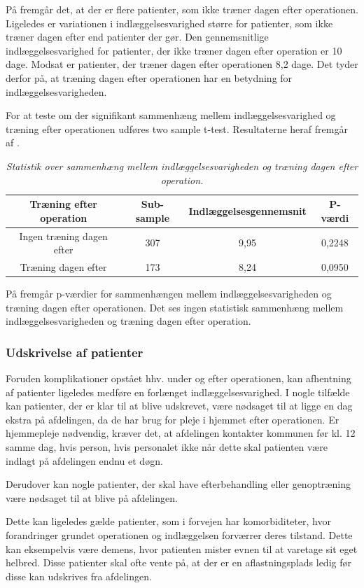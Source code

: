 \noindent
På  fremgår det, at der er flere patienter, som ikke træner dagen efter operationen. Ligeledes er variationen i indlæggelsesvarighed større for patienter, som ikke træner dagen efter end patienter der gør. Den gennemsnitlige indlæggelsesvarighed for patienter, der ikke træner dagen efter operation er 10 dage. Modsat er patienter, der træner dagen efter operationen 8,2 dage. Det tyder derfor på, at træning dagen efter operationen har en betydning for indlæggelsesvarigheden. 

For at teste om der signifikant sammenhæng mellem indlæggelsesvarighed og træning efter operationen udføres two sample t-test. Resultaterne heraf fremgår af . 

\begin{table}[H]
\centering
\begin{tabular}{|c|c|c|c|}
\hline
\textbf{Træning efter operation}    & \textbf{Sub-sample} & \textbf{Indlæggelsesgennemsnit} & \textbf{P-værdi} \\ \hline
Ingen træning dagen efter       & 307                 & 9,95                            & 0,2248           \\ \hline
Træning dagen efter & 173                 & 8,24                            & 0,0950          \\ \hline
\end{tabular}
\caption{\textit{Statistik over sammenhæng mellem indlæggelsesvarigheden og træning dagen efter operation.}}
\label{traeningindlaegtab}
\end{table}

\noindent 
På  fremgår p-værdier for sammenhængen mellem indlæggelsesvarigheden og træning dagen efter operationen. Det ses ingen statistisk sammenhæng mellem indlæggelsesvarigheden og træning dagen efter operation.


\subsubsection{Udskrivelse af patienter}
Foruden komplikationer opstået hhv. under og efter operationen, kan afhentning af patienter ligeledes medføre en forlænget indlæggelsesvarighed. I nogle tilfælde kan patienter, der er klar til at blive udskrevet, være nødsaget til at ligge en dag ekstra på afdelingen, da de har brug for pleje i hjemmet efter operationen. Er hjemmepleje nødvendig, kræver det, at afdelingen kontakter kommunen før kl. 12 samme dag, hvis person, hvis personalet ikke når dette skal patienten være indlagt på afdelingen endnu et døgn. 

Derudover kan nogle patienter, der skal have efterbehandling eller genoptræning være nødsaget til at blive på afdelingen.

Dette kan ligeledes gælde patienter, som i forvejen har komorbiditeter, hvor forandringer grundet operationen og indlæggelsen forværrer deres tilstand. Dette kan eksempelvis være demens, hvor patienten mister evnen til at varetage sit eget helbred. Disse patienter skal ofte vente på, at der er en aflastningsplads ledig før disse kan udskrives fra afdelingen. 


